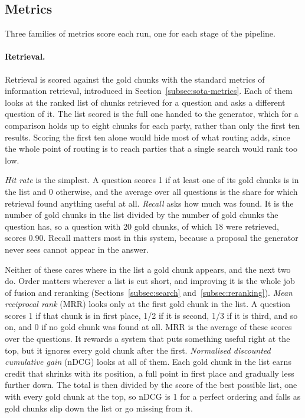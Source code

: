 \subsection{Metrics} \label{subsec:metrics}
Three families of metrics score each run, one for each stage of the pipeline.

\paragraph{Retrieval.} Retrieval is scored against the gold chunks with the
standard metrics of information retrieval, introduced in
Section~\ref{subsec:sota-metrics}. Each of them looks at the ranked list of
chunks retrieved for a question and asks a different question of it. The list
scored is the full one handed to the generator, which for a comparison holds
up to eight chunks for each party, rather than only the first ten results.
Scoring the first ten alone would hide most of what routing adds, since the
whole point of routing is to reach parties that a single search would rank too
low.

\emph{Hit rate} is the simplest. A question scores 1 if at least one of its
gold chunks is in the list and 0 otherwise, and the average over all questions
is the share for which retrieval found anything useful at all. \emph{Recall}
asks how much was found. It is the number of gold chunks in the list divided
by the number of gold chunks the question has, so a question with 20 gold
chunks, of which 18 were retrieved, scores 0.90. Recall matters most in this
system, because a proposal the generator never sees cannot appear in the
answer.

Neither of these cares where in the list a gold chunk appears, and the next
two do. Order matters wherever a list is cut short, and improving it is the
whole job of fusion and reranking (Sections~\ref{subsec:search}
and~\ref{subsec:reranking}). \emph{Mean
reciprocal rank} (MRR) looks only at the first gold chunk in the list. A
question scores 1 if that chunk is in first place, 1/2 if it is second, 1/3 if
it is third, and so on, and 0 if no gold chunk was found at all. MRR is the
average of these scores over the questions. It rewards a system that puts
something useful right at the top, but it ignores every gold chunk after the
first. \emph{Normalised discounted cumulative gain} (nDCG) looks at all of
them. Each gold chunk in the list earns credit that shrinks with its position,
a full point in first place and gradually less further down. The total is then
divided by the score of the best possible list, one with every gold chunk at
the top, so nDCG is 1 for a perfect ordering and falls as gold chunks slip down
the list or go missing from it.

